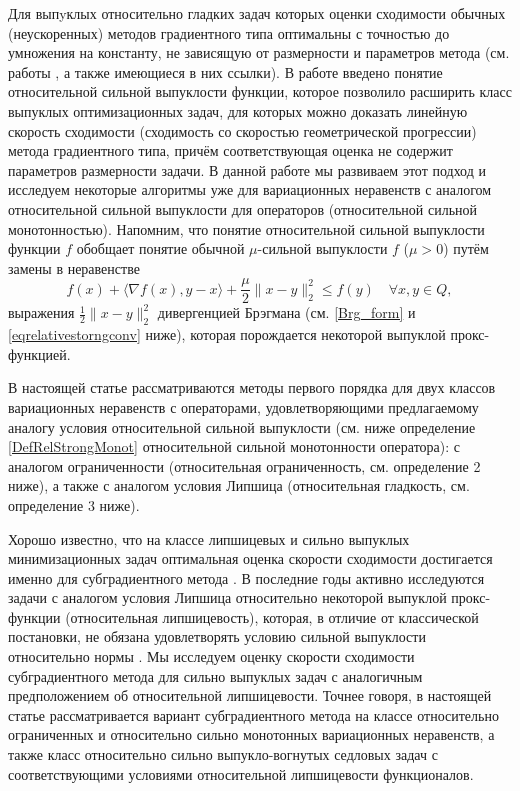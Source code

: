     Для выпyклых относительно гладких задач которых оценки сходимости обычных (неускоренных) методов градиентного типа оптимальны с точностью до умножения на константу, не зависящую от размерности и параметров метода (см. работы \cite{Bauschke,Drag,Dragomir,Lu_Nesterov_2018}, а также имеющиеся в них ссылки). В работе \cite{Lu_Nesterov_2018} введено понятие относительной сильной выпуклости функции, которое позволило расширить класс выпуклых оптимизационных задач, для которых можно доказать линейную скорость сходимости (сходимость со скоростью геометрической прогрессии) метода градиентного типа, причём соответствующая оценка не содержит параметров размерности задачи. В данной работе мы развиваем этот подход и исследуем некоторые алгоритмы уже для вариационных неравенств с аналогом относительной сильной выпуклости для операторов (относительной сильной монотонностью). Напомним, что понятие относительной сильной выпуклости \cite{Lu_Nesterov_2018} функции $f$ обобщает понятие обычной $\mu$-сильной выпуклости $f$ ($\mu > 0$) путём замены в неравенстве 
    \begin{equation}
    	f(x) + \langle \nabla{f(x)}, y - x \rangle  + \frac{\mu}{2} \|x - y \|_2^2 \leq f(y) \quad   \forall x, y \in Q,
    	\end{equation}
    выражения $\frac{1}{2} \|x - y \|_2^2 $ дивергенцией Брэгмана (см. \eqref{Brg_form} и \eqref{eqrelativestorngconv} ниже), которая порождается некоторой выпуклой прокс-функцией. 

    В настоящей статье рассматриваются методы первого порядка для двух классов вариационных неравенств с операторами, удовлетворяющими предлагаемому аналогу условия относительной сильной выпуклости (см. ниже определение  \ref{DefRelStrongMonot} относительной сильной монотонности оператора): с аналогом ограниченности (относительная ограниченность, см. определение 2 ниже), а также с аналогом условия Липшица (относительная гладкость, см. определение 3 ниже).

    Хорошо известно, что на классе липшицевых и сильно выпуклых минимизационных задач оптимальная оценка скорости сходимости достигается именно для субградиентного метода \cite{Simon_Julien_Bach_2012}. В последние годы активно исследуются задачи с аналогом условия Липшица относительно некоторой выпуклой прокс-функции (относительная липшицевость), которая, в отличие от классической постановки, не обязана удовлетворять условию сильной выпуклости относительно нормы \cite{AdaMirr_2021,Lu_2018,Zhou_NIPS_2020}. Мы исследуем оценку скорости сходимости субградиентного метода для сильно выпуклых задач с аналогичным предположением об относительной липшицевости. Точнее говоря, в настоящей статье рассматривается вариант субградиентного метода на классе относительно ограниченных и относительно сильно монотонных вариационных неравенств, а также класс относительно сильно выпукло-вогнутых седловых задач с соответствующими условиями относительной липшицевости функционалов. 

